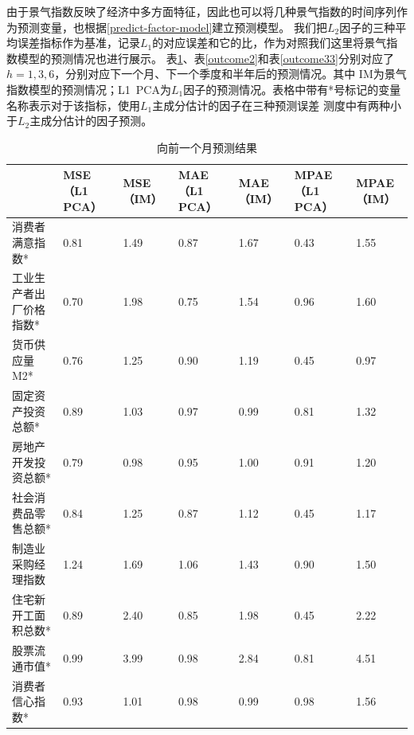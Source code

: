由于景气指数反映了经济中多方面特征，因此也可以将几种景气指数的时间序列作为预测变量，也根据\eqref{predict-factor-model}建立预测模型。
我们把$L_2$因子的三种平均误差指标作为基准，记录$L_1$的对应误差和它的比，作为对照我们这里将景气指数模型的预测情况也进行展示。
表\ref{outcome1}、表\ref{outcome2}和表\ref{outcome33}分别对应了$h = 1, 3, 6$，分别对应下一个月、下一个季度和半年后的预测情况。其中
IM为景气指数模型的预测情况；L1\ PCA为$L_1$因子的预测情况。表格中带有*号标记的变量名称表示对于该指标，使用$L_1$主成分估计的因子在三种预测误差
测度中有两种小于$L_2$主成分估计的因子预测。
\begin{table}[H]
    \small
    \caption{向前一个月预测结果}
    \label{outcome1}
    \centering
    \begin{tabularx}{\textwidth}{lXXXXXX}
    \toprule
                     &  MSE（L1 PCA） &  MSE（IM） &  MAE（L1 PCA） &  MAE（IM） &  MPAE（L1 PCA） &  MPAE（IM） \\ \midrule
    消费者满意指数*     & 0.81            & 1.49        & 0.87            & 1.67        & 0.43             & 1.55         \\
    工业生产者出厂价格指数* & 0.70            & 1.98        & 0.75            & 1.54        & 0.96             & 1.60         \\
    货币供应量M2*      & 0.76            & 1.25        & 0.90            & 1.19        & 0.45             & 0.97         \\
    固定资产投资总额*  & 0.89            & 1.03        & 0.97            & 0.99        & 0.81             & 1.32         \\
    房地产开发投资总额* & 0.79            & 0.98        & 0.95            & 1.00        & 0.91             & 1.20         \\
    社会消费品零售总额* & 0.84            & 1.25        & 0.87            & 1.12        & 0.45             & 1.17         \\
    制造业采购经理指数    & 1.24           & 1.69        & 1.06            & 1.43        & 0.90             & 1.50         \\
    住宅新开工面积总数*  & 0.89            & 2.40        & 0.85            & 1.98        & 0.45             & 2.22         \\
    股票流通市值*      & 0.99            & 3.99        & 0.98            & 2.84        & 0.81             & 4.51         \\
    消费者信心指数*     & 0.93            & 1.01        & 0.98            & 0.99        & 0.98             & 1.56         \\ \bottomrule
    \end{tabularx}
\end{table}

